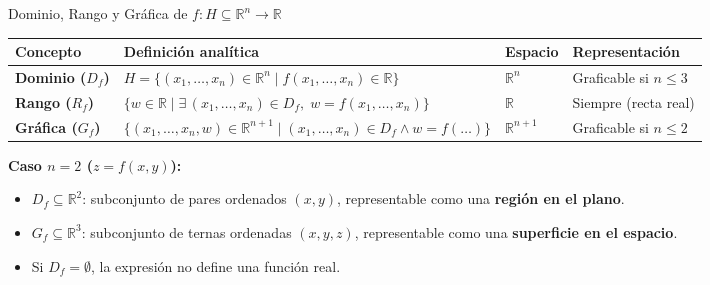 \documentclass[aspectratio=169, 10pt]{beamer}
\begin{document}
\begin{frame}{Dominio, Rango y Gráfica de $f : H \subseteq \mathbb{R}^n \to \mathbb{R}$}
  \begin{table}
    \centering
    \small
    \begin{tabular}{p{2.3cm} p{5.2cm} p{2.3cm} p{3.2cm}}
      \toprule
      \textbf{Concepto} & \textbf{Definición analítica} & \textbf{Espacio} & \textbf{Representación} \\
      \midrule
      \textbf{Dominio ($D_f$)} & $H = \{(x_1,\dots,x_n) \in \mathbb{R}^n \mid f(x_1,\dots,x_n) \in \mathbb{R}\}$ & $\mathbb{R}^n$ & Graficable si $n \le 3$ \\
      \addlinespace
      \textbf{Rango ($R_f$)} & $\{w \in \mathbb{R} \mid \exists\,(x_1,\dots,x_n) \in D_f,\; w = f(x_1,\dots,x_n)\}$ & $\mathbb{R}$ & Siempre (recta real) \\
      \addlinespace
      \textbf{Gráfica ($G_f$)} & $\{(x_1,\dots,x_n,w) \in \mathbb{R}^{n+1} \mid (x_1,\dots,x_n)\in D_f \wedge w = f(\dots)\}$ & $\mathbb{R}^{n+1}$ & Graficable si $n \le 2$ \\
      \bottomrule
    \end{tabular}
  \end{table}

  \vspace{0.3cm}
  \textbf{Caso $n=2$ ($z = f(x,y)$):}
  \begin{itemize}
    \item $D_f \subseteq \mathbb{R}^2$: subconjunto de pares ordenados $(x,y)$, representable como una \textbf{región en el plano}.
    \item $G_f \subseteq \mathbb{R}^3$: subconjunto de ternas ordenadas $(x,y,z)$, representable como una \textbf{superficie en el espacio}.
    \item Si $D_f = \emptyset$, la expresión no define una función real.
  \end{itemize}
\end{frame}
\end{document}
